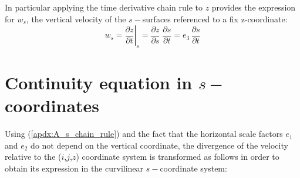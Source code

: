 \documentclass[../main/NEMO_manual]{subfiles}
\begin{document}
In particular applying the time derivative chain rule to $z$ provides the expression for $w_s$,
the vertical velocity of the $s-$surfaces referenced to a fix z-coordinate:
\begin{equation}
  \label{apdx:A_w_in_s}
  w_s   =  \left.   \frac{\partial z }{\partial t}   \right|_s
  = \frac{\partial z}{\partial s} \; \frac{\partial s}{\partial t}
  = e_3 \, \frac{\partial s}{\partial t}
\end{equation}

\section{Continuity equation in $s-$coordinates}
\label{sec:A_continuity}

Using (\autoref{apdx:A_s_chain_rule}) and
the fact that the horizontal scale factors $e_1$ and $e_2$ do not depend on the vertical coordinate,
the divergence of the velocity relative to the ($i$,$j$,$z$) coordinate system is transformed as follows in order to
obtain its expression in the curvilinear $s-$coordinate system:
\end{document}
